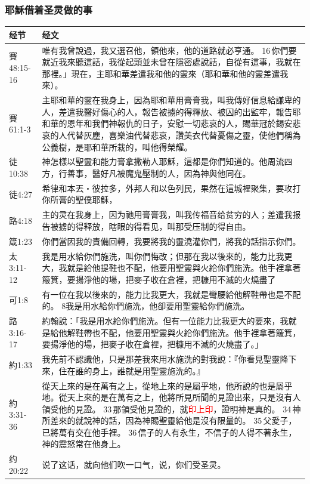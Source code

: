 \subsubsection{耶穌借着圣灵做的事}
\begin{table}[H]
\centering
\begin{tabular}{p{5em}p{42em}}  \toprule
经节&经文 \\  \midrule
賽48:15-16&唯有我曾說過，我又選召他，領他來，他的道路就必亨通。 16 你們要就近我來聽這話，我從起頭並未曾在隱密處說話，自從有這事，我就在那裡。」現在，主耶和華差遣我和他的靈來（耶和華和他的靈差遣我來）。\\  \midrule
賽61:1-3&主耶和華的靈在我身上，因為耶和華用膏膏我，叫我傳好信息給謙卑的人，差遣我醫好傷心的人，報告被擄的得釋放、被囚的出監牢，報告耶和華的恩年和我們神報仇的日子，安慰一切悲哀的人，賜華冠於錫安悲哀的人代替灰塵，喜樂油代替悲哀，讚美衣代替憂傷之靈，使他們稱為公義樹，是耶和華所栽的，叫他得榮耀。\\  \midrule
徒10:38&神怎樣以聖靈和能力膏拿撒勒人耶穌，這都是你們知道的。他周流四方，行善事，醫好凡被魔鬼壓制的人，因為神與他同在。\\ 
徒4:27&希律和本丟‧彼拉多，外邦人和以色列民，果然在這城裡聚集，要攻打你所膏的聖僕耶穌，\\  \midrule
路4:18&主的灵在我身上，因为祂用膏膏我，叫我传福音给贫穷的人；差遣我报告被掳的得释放，瞎眼的得看见，叫那受压制的得自由。\\  \midrule

箴1:23&你們當因我的責備回轉，我要將我的靈澆灌你們，將我的話指示你們。\\  \midrule
太3:11-12&我是用水給你們施洗，叫你們悔改；但那在我以後來的，能力比我更大，我就是給他提鞋也不配，他要用聖靈與火給你們施洗。他手裡拿著簸箕，要揚淨他的場，把麥子收在倉裡，把糠用不滅的火燒盡了\\  \midrule
可1:8&有一位在我以後來的，能力比我更大，我就是彎腰給他解鞋帶也是不配的。 8我是用水給你們施洗，他卻要用聖靈給你們施洗。\\  \midrule
路3:16-17&約翰說：「我是用水給你們施洗。但有一位能力比我更大的要來，我就是給他解鞋帶也不配，他要用聖靈與火給你們施洗。他手裡拿著簸箕，要揚淨他的場，把麥子收在倉裡，把糠用不滅的火燒盡了。」\\  \midrule
約1:33&我先前不認識他，只是那差我來用水施洗的對我說：『你看見聖靈降下來，住在誰的身上，誰就是用聖靈施洗的。』\\  \midrule

約3:31-36&從天上來的是在萬有之上，從地上來的是屬乎地，他所說的也是屬乎地。從天上來的是在萬有之上，他將所見所聞的見證出來，只是沒有人領受他的見證。 33 那領受他見證的，就\textcolor{red}{印上印}，證明神是真的。 34 神所差來的就說神的話，因為神賜聖靈給他是沒有限量的。 35 父愛子，已將萬有交在他手裡。 36 信子的人有永生，不信子的人得不著永生，神的震怒常在他身上。\\  \midrule
约20:22&说了这话，就向他们吹一口气，说，你们受圣灵。\\  \midrule


\end{tabular}
\end{table}
